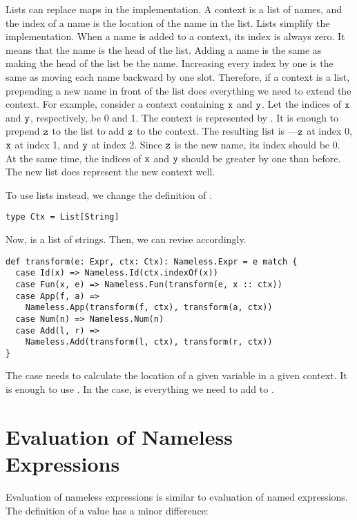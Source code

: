 Lists can replace maps in the implementation. A context is a list of names, and
the index of a name is the location of the name in the list. Lists simplify the
implementation. When a name is added to a context, its index is always zero. It
means that the name is the head of the list. Adding a name is the same as making
the head of the list be the name. Increasing every index by one is the same as
moving each name backward by one slot. Therefore, if a context is a list,
prepending a new name in front of the list does everything we need to extend
the context. For
example, consider a context containing $\texttt{x}$ and $\texttt{y}$. Let the indices of
$\texttt{x}$ and $\texttt{y}$, respectively, be 0 and 1. The context is represented by
. It is enough to prepend $\texttt{z}$ to the list to add
$\texttt{z}$ to the context. The resulting list is ---$\texttt{z}$ at
index 0, $\texttt{x}$ at index 1, and $\texttt{y}$ at index 2. Since $\texttt{z}$ is the new
name, its index should be 0. At the same time, the indices of $\texttt{x}$ and $\texttt{y}$
should be greater by one than before. The new list does represent the new context
well.

To use lists instead, we change the definition of .

\begin{verbatim}
type Ctx = List[String]
\end{verbatim}

Now,  is a list of strings. Then, we can revise 
accordingly.

\begin{verbatim}
def transform(e: Expr, ctx: Ctx): Nameless.Expr = e match {
  case Id(x) => Nameless.Id(ctx.indexOf(x))
  case Fun(x, e) => Nameless.Fun(transform(e, x :: ctx))
  case App(f, a) =>
    Nameless.App(transform(f, ctx), transform(a, ctx))
  case Num(n) => Nameless.Num(n)
  case Add(l, r) =>
    Nameless.Add(transform(l, ctx), transform(r, ctx))
}
\end{verbatim}

The  case needs to calculate the location of a given variable in a given
context. It is enough to use . In the  case,  is everything we need to add  to .

\section{Evaluation of Nameless Expressions}

Evaluation of nameless expressions is similar to evaluation of named
expressions. The definition of a value has a minor difference:

